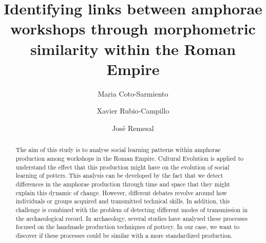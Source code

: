 \documentclass[review]{elsarticle}
\begin{document}
\begin{frontmatter}

\title{Identifying links between amphorae workshops through morphometric similarity within the Roman Empire }


\author[bscadress]{Maria Coto-Sarmiento}


\author[edadress]{Xavier Rubio-Campillo}
\author[ceipacadress]{Jos\'e Remesal}




\address[bscadress]{Barcelona Supercomputing Center (BSC), Jordi Girona 29, Office 3A, Nexus II Building, 08034, Barcelona, Spain}
\address[edadress]{School of Histories, Classic \& Archaeology, Room OOM.22, William Robertson Wing, Old Medical School, Teviot Place, University of Edinburgh, UK}
\address[ceipacadress]{CEIPAC, Department of Prehistory and Archaeology, Montalegre, 6-8, 08001, University of Barcelona, Barcelona, Spain}

\begin{abstract}

The aim of this study is to analyse social learning patterns within amphorae production among workshops in the Roman Empire. Cultural Evolution is applied to understand the effect that this production might have on the evolution of social learning of potters. This analysis can be developed by the fact that we detect differences in the amphorae production through time and space that they might explain this dynamic of change. However,  different debates revolve around how individuals or groups acquired and transmitted technical skills. In addition, this challenge is combined with the problem of detecting different modes of transmission in the archaeological record. In archaeology, several studies have analysed these processes focused on the handmade production techniques of pottery. In our case, we want to discover if these processes could be similar with a more standardized production. 


\end{abstract}
\end{frontmatter}
\end{document}
